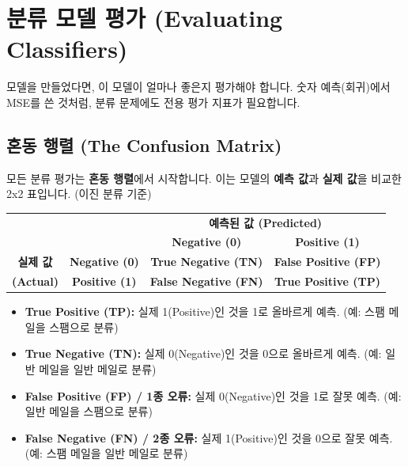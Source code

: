 \documentclass[11pt,a4paper]{book}
\theoremstyle{definition}
\begin{document}
\section{분류 모델 평가 (Evaluating Classifiers)}

모델을 만들었다면, 이 모델이 얼마나 좋은지 평가해야 합니다. 숫자 예측(회귀)에서 MSE를 쓴 것처럼, 분류 문제에도 전용 평가 지표가 필요합니다.

\subsection{혼동 행렬 (The Confusion Matrix)}

모든 분류 평가는 \textbf{혼동 행렬}에서 시작합니다. 이는 모델의 \textbf{예측 값}과 \textbf{실제 값}을 비교한 2x2 표입니다. (이진 분류 기준)

\begin{center}
\begin{tabular}{cc|cc}
\multicolumn{2}{c}{} & \multicolumn{2}{c}{\textbf{예측된 값 (Predicted)}} \\
\multicolumn{2}{c}{} & \textbf{Negative (0)} & \textbf{Positive (1)} \\
\midrule
\textbf{실제 값} & \textbf{Negative (0)} & \textbf{True Negative (TN)} & \textbf{False Positive (FP)} \\
\textbf{(Actual)}   & \textbf{Positive (1)} & \textbf{False Negative (FN)} & \textbf{True Positive (TP)} \\
\end{tabular}
\end{center}

\begin{defbox}[title=혼동 행렬의 4가지 요소]
\begin{itemize}
    \item \textbf{True Positive (TP):} 실제 1(Positive)인 것을 1로 올바르게 예측. (예: 스팸 메일을 스팸으로 분류)
    \item \textbf{True Negative (TN):} 실제 0(Negative)인 것을 0으로 올바르게 예측. (예: 일반 메일을 일반 메일로 분류)
    \item \textbf{False Positive (FP) / 1종 오류:} 실제 0(Negative)인 것을 1로 잘못 예측. (예: 일반 메일을 스팸으로 분류)
    \item \textbf{False Negative (FN) / 2종 오류:} 실제 1(Positive)인 것을 0으로 잘못 예측. (예: 스팸 메일을 일반 메일로 분류)
\end{itemize}
\end{defbox}
\end{document}
